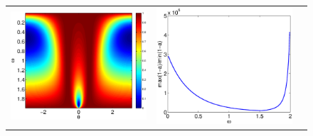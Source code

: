\documentclass{article}
\begin{document}



\clearpage

\begin{figure}
\centering
\begin{tabular}{ccc}
\includegraphics[scale=.2]{G10}&
\includegraphics[scale=.2]{kappa}&

\end{tabular}
\end{figure}
\end{document}
